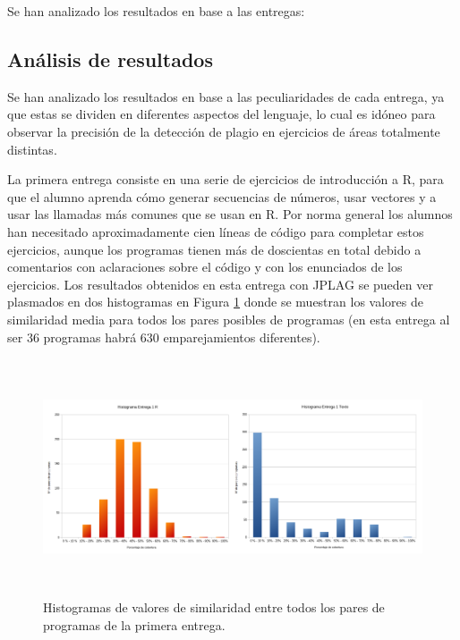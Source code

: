 Se han analizado los resultados en base a las entregas:
\subsection{Análisis de resultados}

Se han analizado los resultados en base a las peculiaridades de cada entrega, ya que estas se dividen en diferentes aspectos del lenguaje, lo cual es idóneo para observar la precisión de la detección de plagio en ejercicios de áreas totalmente distintas.

\bigskip


La primera entrega consiste en una serie de ejercicios de introducción a R, para que el alumno aprenda cómo generar secuencias de números, usar vectores y a usar las llamadas más comunes que se usan en R.
\newline
Por norma general los alumnos han necesitado aproximadamente cien líneas de código para completar estos ejercicios, aunque los programas tienen más de doscientas en total debido a comentarios con aclaraciones sobre el código y con los enunciados de los ejercicios.
\newline
Los resultados obtenidos en esta entrega con JPLAG se pueden ver plasmados en dos histogramas en Figura \ref{fig:histograma1} donde se muestran los valores de similaridad media para todos los pares posibles de programas (en esta entrega al ser 36 programas habrá 630 emparejamientos diferentes).


\begin{figure}[H] %
\centering
\includegraphics[width=15cm, height=7cm]{imagenes/histograma1.png}  %
\caption{Histogramas de valores de similaridad entre todos los pares de programas de la primera entrega.} \label{fig:histograma1}
\end{figure}




